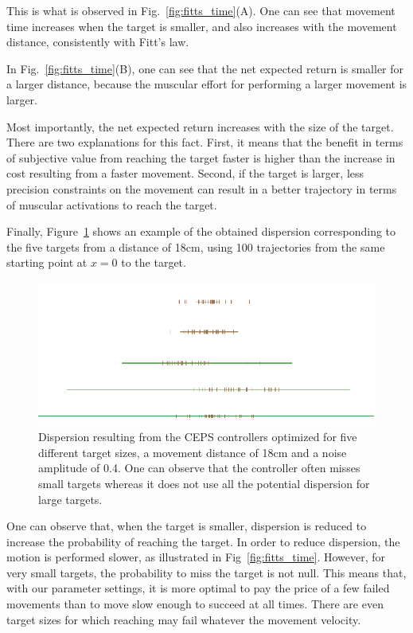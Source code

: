 \documentclass[10pt]{article}
\begin{document}
This is what is observed in Fig.~\ref{fig:fitts_time}(A). One can see that movement time increases when the target is smaller, and also increases with the movement distance, consistently with Fitt's law. 

In Fig.~\ref{fig:fitts_time}(B), one can see that the net expected return is smaller for a larger distance, because the muscular effort for performing a larger movement is larger.

Most importantly, the net expected return increases with the size of the target.
There are two explanations for this fact. First, it means that the benefit in terms of subjective value from reaching the target faster is higher than the increase in cost resulting from a faster movement. Second, if the target is larger, less precision constraints on the movement can result in a better trajectory in terms of muscular activations to reach the target.


Finally, Figure~\ref{fig:dispersion} shows an example of the obtained dispersion corresponding to the five targets from a distance of 18cm, using 100 trajectories from the same starting point at $x=0$ to the target.

\begin{figure}[htp]
  \centering
\includegraphics[width=.7\columnwidth]{images/disp_glob}
  \caption{Dispersion resulting from the CEPS controllers optimized for five different target sizes, a movement distance of 18cm and a noise amplitude of 0.4. One can observe that the controller often misses small targets whereas it does not use all the potential dispersion for large targets.
\label{fig:dispersion}}
\end{figure}

One can observe that, when the target is smaller, dispersion is reduced to increase the probability of reaching the target. In order to reduce dispersion, the motion is performed slower, as illustrated in Fig~\ref{fig:fitts_time}. However, for very small targets, the probability to miss the target is not null. This means that, with our parameter settings, it is more optimal to pay the price of a few failed movements than to move slow enough to succeed at all times. There are even target sizes for which reaching may fail whatever the movement velocity.
\end{document}
